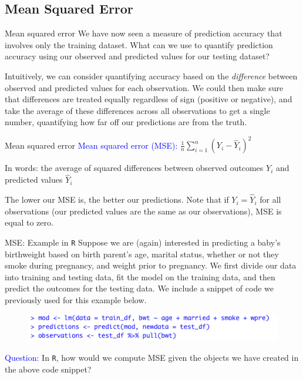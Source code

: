 \documentclass[10pt,t]{beamer}
\begin{document}
\subsection{Mean Squared Error}

\begin{frame}{Mean squared error}
We have now seen a measure of prediction accuracy that involves only the training dataset. What can we use to quantify prediction accuracy using our observed and predicted values for our testing dataset?

\vspace{0.3cm}

Intuitively, we can consider quantifying accuracy based on the \textit{difference} between observed and predicted values for each observation. We could then make sure that differences are treated equally regardless of sign (positive or negative), and take the average of these differences across all observations to get a single number, quantifying how far off our predictions are from the truth.  
\end{frame}

\begin{frame}{Mean squared error}
\textcolor{blue}{Mean squared error (MSE):} $\frac{1}{n} \sum_{i = 1}^n (Y_i - \hat{Y}_i)^2$

\vspace{0.3cm} In words: the average of squared differences between observed outcomes $Y_i$ and predicted values $\hat{Y}_i$

\vspace{0.3cm} \pause
The lower our MSE is, the better our predictions. Note that if $Y_i = \hat{Y}_i$ for all observations (our predicted values are the same as our observations), MSE is equal to zero.
\end{frame}

\begin{frame}{MSE: Example in \texttt{R}}
Suppose we are (again) interested in predicting a baby's birthweight based on birth parent's age, marital status, whether or not they smoke during pregnancy, and weight prior to pregnancy. We first divide our data into training and testing data, fit the model on the training data, and then predict the outcomes for the testing data. We include a snippet of code we previously used for this example below.

\vspace{0.3cm}

\begin{figure}
	\centering \includegraphics[scale=0.5]{mse1.png}
\end{figure}

\vspace{0.3cm} \pause

\textcolor{blue}{Question:} In \texttt{R}, how would we compute MSE given the objects we have created in the above code snippet?
\end{frame}
\end{document}
